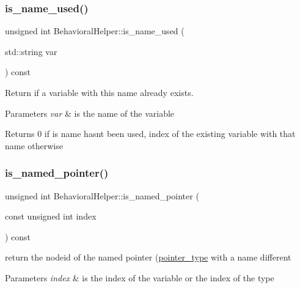 \subsubsection{\texorpdfstring{is\+\_\+name\+\_\+used()}{is\_name\_used()}}
{\footnotesize\ttfamily unsigned int Behavioral\+Helper\+::is\+\_\+name\+\_\+used (\begin{DoxyParamCaption}\item[{std\+::string}]{var }\end{DoxyParamCaption}) const}



Return if a variable with this name already exists. 


\begin{DoxyParams}{Parameters}
{\em var} & is the name of the variable \\
\hline
\end{DoxyParams}
\begin{DoxyReturn}{Returns}
0 if is name hasn\textquotesingle{}t been used, index of the existing variable with that name otherwise 
\end{DoxyReturn}
\mbox{\label{classBehavioralHelper_a599b68e8bc619c214160051c6e931bec}} 
\subsubsection{\texorpdfstring{is\+\_\+named\+\_\+pointer()}{is\_named\_pointer()}}
{\footnotesize\ttfamily unsigned int Behavioral\+Helper\+::is\+\_\+named\+\_\+pointer (\begin{DoxyParamCaption}\item[{const unsigned int}]{index }\end{DoxyParamCaption}) const\hspace{0.3cm}{\ttfamily [virtual]}}



return the nodeid of the named pointer (\hyperlink{structpointer__type}{pointer\+\_\+type} with a name different 


\begin{DoxyParams}{Parameters}
{\em index} & is the index of the variable or the index of the type \\
\hline
\end{DoxyParams}


